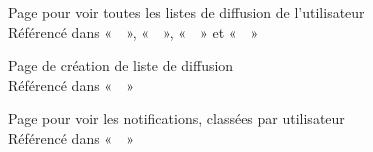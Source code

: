 \begin{figure}
    \caption[Page pour voir toutes les listes de diffusion de l'utilisateur]{Page pour voir toutes les listes de diffusion de l'utilisateur\\Référencé dans «~~»,  «~~», «~~» et «~~»}
    \centering
    \label{fig:Mes listes d'amis}    
\end{figure}

\begin{figure}
    \caption[Page de création de liste de diffusion]{Page de création de liste de diffusion\\Référencé dans «~~»}
    \centering
    \label{fig:Créer une liste}
\end{figure}

\begin{figure}
    \caption[Page pour voir les notifications, classées par utilisateur]{Page pour voir les notifications, classées par utilisateur\\Référencé dans «~~»}
    \centering
    \label{fig:Mes notifications - Utilisateurs}
\end{figure}

